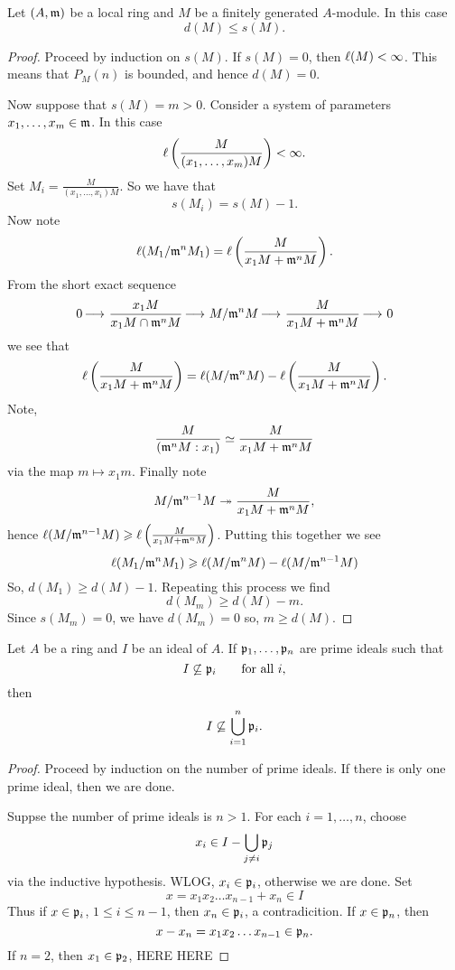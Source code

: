 \documentclass{ximera}
\begin{document}
\begin{lemma}[$\boldsymbol{d(M)\le s(M)}$]\label{L:ds}
  Let $(A,\mathfrak{m})$ be a local ring and $M$ be a finitely generated
  $A$-module. In this case
  \[
  d(M)\le s(M).
  \]
  \begin{proof}
    Proceed by induction on $s(M)$. If $s(M) = 0$, then
    $\ell(M)< \infty$. This means that $P_M(n)$ is bounded, and hence
    $d(M) = 0$.

    Now suppose that $s(M) = m >0$. Consider a system of
    parameters $x_1,\dots, x_m\in \mathfrak{m}$. In this case
    \[
    \ell\left( \frac{M}{(x_1,\dots,x_m)M} \right)<\infty.
    \]
    Set $M_i = \frac{M}{(x_1,\dots,x_i)M}$. So we have that
    \[
    s(M_i) = s(M)-1.
    \]
    Now note
    \[
    \ell(M_1/\mathfrak{m}^n M_1) = \ell\left(\frac{M}{x_1 M + \mathfrak{m}^n M}\right).
    \]
    From the short exact sequence
    \[
    0\mathop{\longrightarrow\,}\limits \frac{x_1M}{x_1 M \cap \mathfrak{m}^n M} \mathop{\longrightarrow\,}\limits  M/\mathfrak{m}^n M \mathop{\longrightarrow\,}\limits \frac{M}{x_1 M + \mathfrak{m}^n M}\mathop{\longrightarrow\,}\limits 0
    \]
    we see that
    \[
    \ell\left(\frac{M}{x_1 M + \mathfrak{m}^n M}\right) = \ell(M/\mathfrak{m}^n M) - \ell \left(\frac{M}{x_1 M + \mathfrak{m}^n M}\right).
    \]
    Note,
    \[
    \frac{M}{(\mathfrak{m}^nM:x_1)}\simeq \frac{M}{x_1 M + \mathfrak{m}^n M}
    \]
    via the map $m\mapsto x_1 m$. Finally note
    \[
    M/\mathfrak{m}^{n-1}M \twoheadrightarrow \frac{M}{x_1 M + \mathfrak{m}^n M},
    \]
    hence $\ell(M/\mathfrak{m}^{n-1}M)\geqslant \ell\left(\frac{M}{x_1 M + \mathfrak{m}^n
      M}\right)$. Putting this together we see
    \[
    \ell(M_1/\mathfrak{m}^n M_1) \geqslant \ell(M/\mathfrak{m}^n M) - \ell(M/\mathfrak{m}^{n-1}M)
    \]
    So, $d(M_1) \ge d(M) - 1$. Repeating this process we find
    \[
    d(M_m) \ge d(M) -m.
    \]
    Since $s(M_m) = 0$, we have $d(M_m) = 0$ so, $m\ge d(M)$.
  \end{proof}
\end{lemma}





\begin{lemma}\label{L:PA}
Let $A$ be a ring and $I$ be an ideal of $A$.  If $\mathfrak{p}_1,\ldots,\mathfrak{p}_n$
are prime ideals such that
\[
I \not\subseteq \mathfrak{p}_i \qquad\text{for all $i$,}
\]
then 
\[
I \not\subseteq \bigcup_{i = 1}^n \mathfrak{p}_i.
\]
\begin{proof}
  Proceed by induction on the number of prime ideals. If there is only
  one prime ideal, then we are done.

  Suppse the number of prime ideals is $n>1$. For each $i =
  1,\dots,n$, choose
  \[
  x_i \in I - \bigcup_{j \ne i} \mathfrak{p}_j
  \]
  via the inductive hypothesis. WLOG, $x_i\in\mathfrak{p}_i$, otherwise we are done.  Set
  \[
  x = x_1x_2\dots x_{n-1} + x_n \in I
  \]
  Thus if $x\in\mathfrak{p}_i$, $1\le i\le n-1$, then $x_n\in \mathfrak{p}_i$, a
  contradicition. If $x\in\mathfrak{p}_n$, then
  \[
  x-x_n = x_1x_2\dots x_{n-1}\in \mathfrak{p}_n.
  \]
  If $n = 2$, then $x_1\in \mathfrak{p}_2$, HERE HERE
\end{proof}
\end{lemma}
\end{document}
